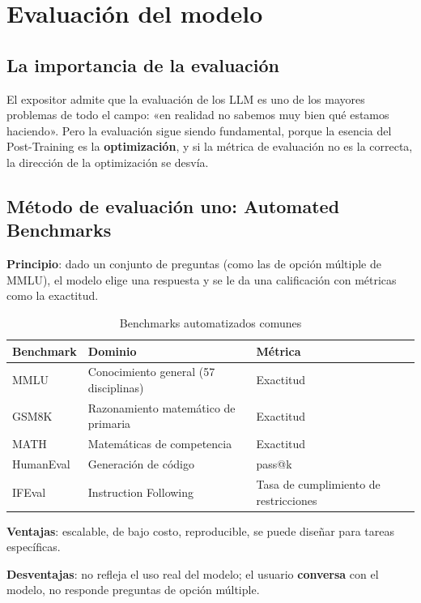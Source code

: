 \documentclass[a4paper]{article}
\begin{document}
\newpage
\section{Evaluación del modelo}

\subsection{La importancia de la evaluación}

El expositor admite que la evaluación de los LLM es uno de los mayores problemas de todo el campo: «en realidad no sabemos muy bien qué estamos haciendo». Pero la evaluación sigue siendo fundamental, porque la esencia del Post-Training es la \textbf{optimización}, y si la métrica de evaluación no es la correcta, la dirección de la optimización se desvía.

\subsection{Método de evaluación uno: Automated Benchmarks}

\textbf{Principio}: dado un conjunto de preguntas (como las de opción múltiple de MMLU), el modelo elige una respuesta y se le da una calificación con métricas como la exactitud.

\begin{table}[H]
\centering
\caption{Benchmarks automatizados comunes}
\begin{tabular}{lll}
\toprule
\textbf{Benchmark} & \textbf{Dominio} & \textbf{Métrica} \\
\midrule
MMLU & Conocimiento general (57 disciplinas) & Exactitud \\
GSM8K & Razonamiento matemático de primaria & Exactitud \\
MATH & Matemáticas de competencia & Exactitud \\
HumanEval & Generación de código & pass@k \\
IFEval & Instruction Following & Tasa de cumplimiento de restricciones \\
\bottomrule
\end{tabular}
\end{table}

\textbf{Ventajas}: escalable, de bajo costo, reproducible, se puede diseñar para tareas específicas.

\textbf{Desventajas}: no refleja el uso real del modelo; el usuario \textbf{conversa} con el modelo, no responde preguntas de opción múltiple.
\end{document}
